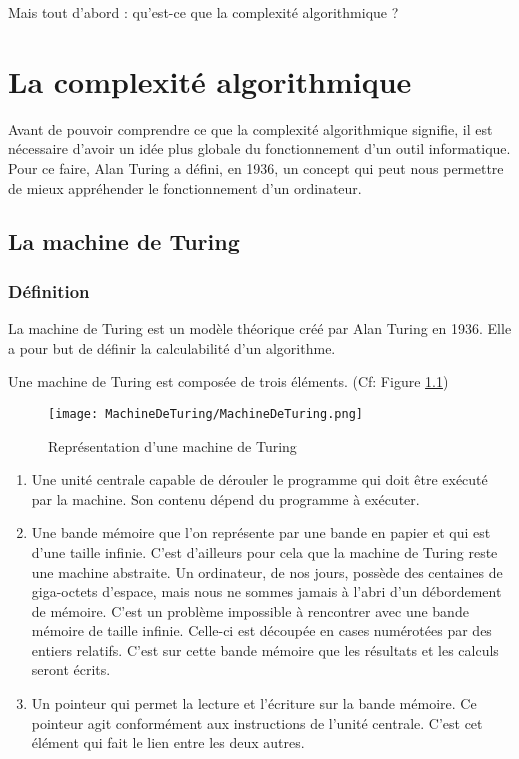 \documentclass[12pt, twoside, openright]{report}
\begin{document}
Mais tout d'abord : qu'est-ce que la complexité algorithmique ? 

\chapter{La complexité algorithmique}

Avant de pouvoir comprendre ce que la complexité algorithmique signifie, il est nécessaire d'avoir un idée plus globale du fonctionnement d'un outil informatique. Pour ce faire, Alan Turing a défini, en 1936, un concept qui peut nous permettre de mieux appréhender le fonctionnement d'un ordinateur. 

\section{La machine de Turing}

\subsection{Définition}

La machine de Turing est un modèle théorique créé par Alan Turing en 1936. \cite{machineTuring01} Elle a pour but de définir la calculabilité d'un algorithme.   

Une machine de Turing est composée de trois éléments. (Cf: Figure \ref{fig:turing-1})

\begin{figure}[H]
    \begin{center}
        \texttt{[image: MachineDeTuring/MachineDeTuring.png]}
        \caption{Représentation d'une machine de Turing}
        \label{fig:turing-1}
    \end{center}
\end{figure}

\vspace{0.4cm}

\begin{enumerate}
    \item Une unité centrale capable de dérouler le programme qui doit être exécuté par la machine. Son contenu dépend du programme à exécuter.
    \item Une bande mémoire que l'on représente par une bande en papier et qui est d'une taille infinie. C'est d'ailleurs pour cela que la machine de Turing reste une machine abstraite. Un ordinateur, de nos jours, possède des centaines de giga-octets d'espace, mais nous ne sommes jamais à l'abri d'un débordement de mémoire. C'est un problème impossible à rencontrer avec une bande mémoire de taille infinie. Celle-ci est découpée en cases numérotées par des entiers relatifs. C'est sur cette bande mémoire que les résultats et les calculs seront écrits. 
    \item Un pointeur qui permet la lecture et l'écriture sur la bande mémoire. Ce pointeur agit conformément aux instructions de l'unité centrale. C'est cet élément qui fait le lien entre les deux autres.
\end{enumerate}
\vspace{0.4cm}
\end{document}
